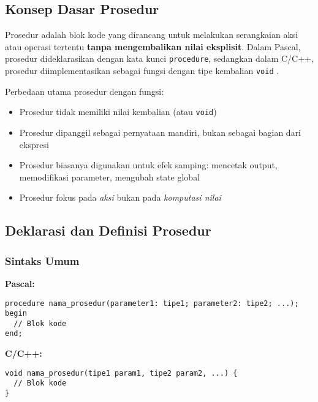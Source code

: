 \documentclass[../main.tex]{subfiles}
\begin{document}
\subsection{Konsep Dasar Prosedur}
Prosedur adalah blok kode yang dirancang untuk melakukan serangkaian aksi atau operasi tertentu \textbf{tanpa mengembalikan nilai eksplisit}. Dalam Pascal, prosedur dideklarasikan dengan kata kunci \texttt{procedure}, sedangkan dalam C/C++, prosedur diimplementasikan sebagai fungsi dengan tipe kembalian \texttt{void} \parencite{pascal-procedure-function,c-functions}.

Perbedaan utama prosedur dengan fungsi:
\begin{itemize}
  \item Prosedur tidak memiliki nilai kembalian (atau \texttt{void})
  \item Prosedur dipanggil sebagai pernyataan mandiri, bukan sebagai bagian dari ekspresi
  \item Prosedur biasanya digunakan untuk efek samping: mencetak output, memodifikasi parameter, mengubah state global
  \item Prosedur fokus pada \emph{aksi} bukan pada \emph{komputasi nilai}
\end{itemize}

\subsection{Deklarasi dan Definisi Prosedur}
\subsubsection{Sintaks Umum}
\textbf{Pascal:}
\begin{verbatim}
procedure nama_prosedur(parameter1: tipe1; parameter2: tipe2; ...);
begin
  // Blok kode
end;
\end{verbatim}

\textbf{C/C++:}
\begin{verbatim}
void nama_prosedur(tipe1 param1, tipe2 param2, ...) {
  // Blok kode
}
\end{verbatim}
\end{document}
